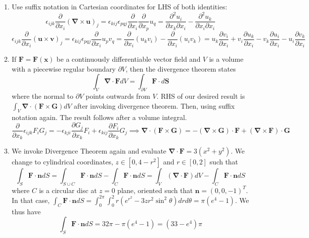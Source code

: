 \documentclass[a4paper]{article}
\begin{document}
\begin{ans}\leavevmode
\begin{enumerate}[label=(\roman*)]
    \item Use suffix notation in Cartesian coordinates for LHS of both identities:
$$\epsilon_{ijk}\frac{\partial}{\partial x_i}(\boldsymbol{\nabla}\times\mathbf{u})_j=\epsilon_{kij}\epsilon_{pqj}\frac{\partial}{\partial x_i}\frac{\partial}{\partial x_p}u_q=\frac{\partial^2u_i}{\partial x_k\partial x_i}-\frac{\partial^2u_k}{\partial x_i\partial x_i}$$
$$\epsilon_{ijk}\frac{\partial}{\partial x_i}(\mathbf{u}\times\mathbf{v})_j=\epsilon_{kij}\epsilon_{pqj}\frac{\partial}{\partial x_i}u_pv_q=\frac{\partial}{\partial x_i}(u_kv_i)-\frac{\partial}{\partial x_i}(u_iv_k)=u_k\frac{\partial v_i}{\partial x_i}+v_i\frac{\partial u_k}{\partial x_i}-v_k\frac{\partial u_i}{\partial x_i}-u_i\frac{\partial v_k}{\partial x_i}$$
\item If $\mathbf{F}=\mathbf{F}(\mathbf{x})$ be a continuously differentiable vector field and $V$ is a volume with a piecewise regular boundary $\partial V$, then the divergence theorem states
$$\int_V\boldsymbol{\nabla}\cdot\mathbf{F}dV=\int_{\partial V}\mathbf{F}\cdot d\mathbf{S}$$
where the normal to $\partial V$ points outwards from $V$. RHS of our desired result is $\int_V\boldsymbol{\nabla}\cdot(\mathbf{F}\times\mathbf{G})dV$ after invoking divergence theorem. Then, using suffix notation again. The result follows after a volume integral.
$$\frac{\partial}{\partial x_k}\epsilon_{ijk}F_iG_j=-\epsilon_{kji}\frac{\partial G_j}{\partial x_k}F_i+\epsilon_{kij}\frac{\partial F_i}{\partial x_k}G_j\implies\boldsymbol{\nabla}\cdot(\mathbf{F}\times\mathbf{G})=-(\boldsymbol{\nabla}\times\mathbf{G})\cdot\mathbf{F}+(\boldsymbol{\nabla}\times\mathbf{F})\cdot\mathbf{G}$$ 
\item We invoke Divergence Theorem again and evaluate $\boldsymbol{\nabla}\cdot\mathbf{F}=3(x^2+y^2)$. We change to cylindrical coordinates, $z\in[0,4-r^2]$ and $r\in[0,2]$ such that
$$\int_S\mathbf{F}\cdot\mathbf{n}dS=\int_{S\cup C}\mathbf{F}\cdot\mathbf{n}dS-\int_C\mathbf{F}\cdot\mathbf{n}dS=\int_V(\boldsymbol{\nabla}\cdot\mathbf{F})dV-\int_C\mathbf{F}\cdot\mathbf{n}dS$$
where $C$ is a circular disc at $z=0$ plane, oriented such that $\mathbf{n}=(0,0,-1)^T$. In that case, $\int_C\mathbf{F}\cdot\mathbf{n}dS=\int_0^{2\pi}\int_0^2 r(e^{r^2}-3zr^2\sin^2\theta)drd\theta=\pi(e^4-1)$. We thus have
$$\int_S\mathbf{F}\cdot\mathbf{n}dS=32\pi-\pi(e^4-1)=(33-e^4)\pi$$
\end{enumerate}
\end{ans}
\end{document}

